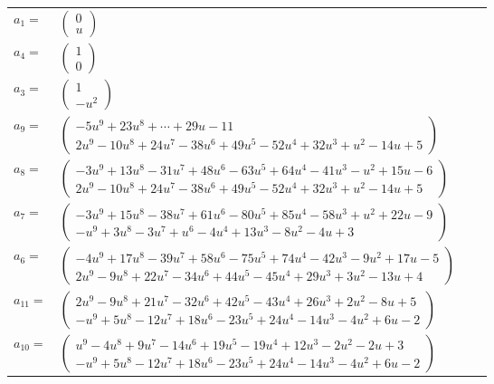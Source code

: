 \documentclass[1p]{elsarticle_modified}
\theoremstyle{definition}
\begin{document}
\begin{tabular}{m{7pt} m{180pt} m{7pt} m{180pt} }
\flushright $a_{1}=$&$\begin{pmatrix}0\\u\end{pmatrix}$ \\
\flushright $a_{4}=$&$\begin{pmatrix}1\\0\end{pmatrix}$ \\
\flushright $a_{3}=$&$\begin{pmatrix}1\\- u^2\end{pmatrix}$ \\
\flushright $a_{9}=$&$\begin{pmatrix}-5 u^9+23 u^8+\cdots+29 u-11\\2 u^9-10 u^8+24 u^7-38 u^6+49 u^5-52 u^4+32 u^3+u^2-14 u+5\end{pmatrix}$ \\
\flushright $a_{8}=$&$\begin{pmatrix}-3 u^9+13 u^8-31 u^7+48 u^6-63 u^5+64 u^4-41 u^3- u^2+15 u-6\\2 u^9-10 u^8+24 u^7-38 u^6+49 u^5-52 u^4+32 u^3+u^2-14 u+5\end{pmatrix}$ \\
\flushright $a_{7}=$&$\begin{pmatrix}-3 u^9+15 u^8-38 u^7+61 u^6-80 u^5+85 u^4-58 u^3+u^2+22 u-9\\- u^9+3 u^8-3 u^7+u^6-4 u^4+13 u^3-8 u^2-4 u+3\end{pmatrix}$ \\
\flushright $a_{6}=$&$\begin{pmatrix}-4 u^9+17 u^8-39 u^7+58 u^6-75 u^5+74 u^4-42 u^3-9 u^2+17 u-5\\2 u^9-9 u^8+22 u^7-34 u^6+44 u^5-45 u^4+29 u^3+3 u^2-13 u+4\end{pmatrix}$ \\
\flushright $a_{11}=$&$\begin{pmatrix}2 u^9-9 u^8+21 u^7-32 u^6+42 u^5-43 u^4+26 u^3+2 u^2-8 u+5\\- u^9+5 u^8-12 u^7+18 u^6-23 u^5+24 u^4-14 u^3-4 u^2+6 u-2\end{pmatrix}$ \\
\flushright $a_{10}=$&$\begin{pmatrix}u^9-4 u^8+9 u^7-14 u^6+19 u^5-19 u^4+12 u^3-2 u^2-2 u+3\\- u^9+5 u^8-12 u^7+18 u^6-23 u^5+24 u^4-14 u^3-4 u^2+6 u-2\end{pmatrix}$ \\

\end{tabular}
\end{document}
